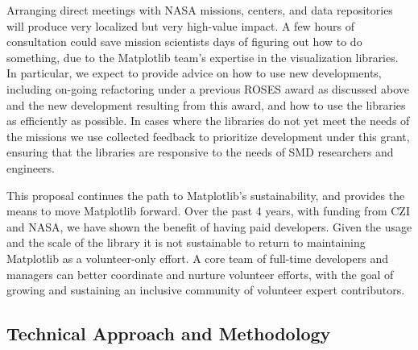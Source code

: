 \documentclass[12pt]{article}
\numberwithin{page}{section}
\begin{document}

Arranging direct meetings with NASA missions, centers, and data repositories
will produce very localized but very high-value impact.  A few hours of
consultation could save mission scientists days of figuring out how to do
something, due to the Matplotlib team's expertise in the visualization
libraries.  In particular, we expect to provide advice on how to use new
developments, including on-going refactoring under a previous ROSES award as
discussed above and the new development resulting from this award, and how to
use the libraries as efficiently as possible.  In cases where the libraries do
not yet meet the needs of the missions we use collected feedback to prioritize
development under this grant, ensuring that the libraries are responsive to the
needs of SMD researchers and engineers.

This proposal continues the path to Matplotlib's sustainability, and provides the means to
move Matplotlib forward.  Over the past 4 years, with funding from CZI and NASA, we have
shown the benefit of having paid developers.
Given the usage and the scale of
the library it is not sustainable to return to maintaining Matplotlib as a
volunteer-only effort.  A core team of full-time developers and managers can
better coordinate and nurture volunteer efforts, with the goal of growing and
sustaining an inclusive community of volunteer expert contributors.


\subsection{Technical Approach and Methodology}
\end{document}
